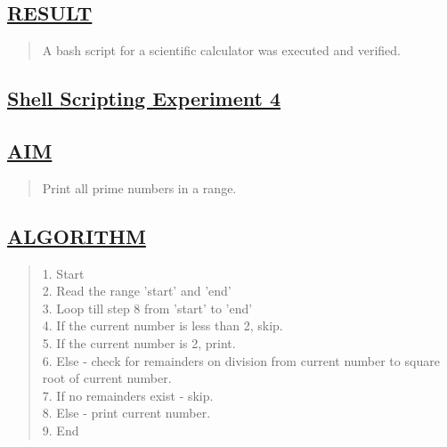 \documentclass[a4paper, 12pt]{article}
\begin{document}
\begin{figure}[H] 
    \centering
\end{figure}


\subsection*{\underline{RESULT}}
\begin{quote}
A bash script for a scientific calculator was executed and verified.
\end{quote}

\newpage
\begin{center}
\section*{\LARGE \textbf{\underline{Shell Scripting Experiment 4}}} %
\end{center}

\subsection*{\underline{AIM}}
\begin{quote}
Print all prime numbers in a range.

\end{quote}

\subsection*{\underline{ALGORITHM}}
\begin{quote}
1. Start\\
2. Read the range 'start' and 'end'\\
3. Loop till step 8 from 'start' to 'end'\\
4. If the current number is less than 2, skip.\\
5. If the current number is 2, print.\\
6. Else - check for remainders on division from current number to square root of current number.\\
7. If no remainders exist - skip.\\
8. Else - print current number.\\
9. End\\
\end{quote}
\end{document}
